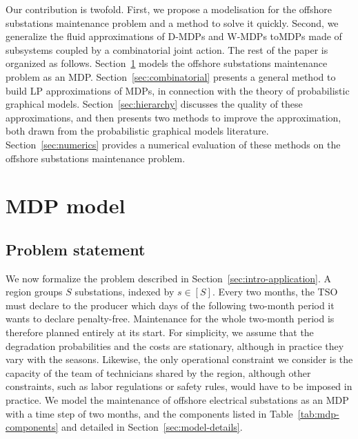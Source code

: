 \documentclass{article}
\begin{document}
Our contribution is twofold. First, we propose a modelisation for the offshore substations maintenance
problem and a method to solve it quickly. Second, we generalize the
fluid approximations of D-MDPs and W-MDPs toMDPs made of subsystems coupled by a combinatorial joint
action. The rest of the paper is organized as follows. Section~\ref{sec:problem-statement} models the offshore substations maintenance problem as an MDP.
Section~\ref{sec:combinatorial} presents a general method to build LP approximations of MDPs, in connection with the
theory of probabilistic graphical models. Section~\ref{sec:hierarchy} discusses the quality of these
approximations, and then presents two methods to improve the approximation, both drawn from the
probabilistic graphical models literature.
Section~\ref{sec:numerics} provides a numerical evaluation of these methods on the offshore substations maintenance problem.

\section{MDP model}
\label{sec:problem-statement}


\subsection{Problem statement}

We now formalize the problem described in Section~\ref{sec:intro-application}. A region groups $S$ substations, indexed by $s \in [S]$. Every two months, the TSO must declare to the
producer which days of the following two-month period it wants to declare penalty-free. Maintenance for the whole
two-month period is therefore planned entirely at its start. For simplicity, we assume that the degradation
probabilities and the costs are stationary, although in practice they vary with the seasons. Likewise, the only
operational constraint we consider is the capacity of the team of technicians shared by the region, although other
constraints, such as labor regulations or safety rules, would have to be imposed in practice. We model the maintenance of offshore electrical substations as an MDP with a
time step of two months, and the components listed in Table~\ref{tab:mdp-components} and detailed in
Section~\ref{sec:model-details}.
\end{document}
